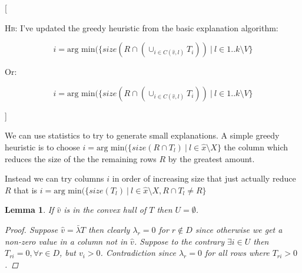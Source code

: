 \documentclass{article}
\newtheorem{lemma}{Lemma}
\newcommand{\hb}[1]{\colorPars{red}{{\textsc{Hb:} #1}}}
\newcommand{\colorPars}[2]{{\leavevmode\color{#1}[#2]}}
\newcommand{\ignore}[1]{}
\begin{document}
\hb{
I've updated the greedy heuristic from the basic explanation algorithm:

$$
i = \text{arg~min}(\{ size(R \cap (\cup_{i \in C(\hat{v},l)} T_i)) ~|~ l \in 1..k \setminus V\}
$$

Or:

$$
i = \text{arg~min}(\{ size(R \cap (\cup_{i \in C(\hat{v},l)} T_i)) ~|~ l \in 1..k \setminus V\}
$$

}

We can use statistics to try to generate small explanations.
A simple greedy heuristic is to choose
$i = \text{arg~min}(\{ size(R \cap T_l) ~|~ l \in \hat{x} \setminus X\}$
the column which reduces the size of the the remaining rows $R$ by the greatest amount.

Instead we can try columns $i$ in order of increasing size that just actually reduce $R$ that is
$i = \text{arg~min}(\{ size(T_l) ~|~ l \in \hat{x} \setminus X, R \cap T_l \neq R\}$ 


\ignore{

\hb{
Questions, what heuristic should we chose for choosing the $l$'s?
}
}

\begin{lemma}
    If $\hat{v}$ is in the convex hull of $T$ then $U = \emptyset$.
    \begin{proof}
        Suppose $\hat{v} = \bar{\lambda} T$ 
        then clearly $\lambda_r = 0$ for $r \not\in D$ since otherwise we get a non-zero value in a column not in $\hat{v}$. 
        Suppose to the contrary $\exists i \in U$ then $T_{ri} = 0, \forall r \in D$, but $v_i > 0$. Contradiction since $\lambda_r = 0$ for all rows where $T_{ri} > 0$.
    \end{proof}
\end{lemma}
\end{document}

